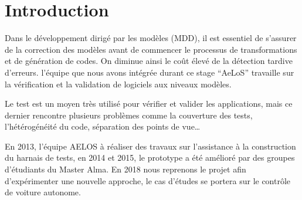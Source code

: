 \documentclass[
10pt, %
a4paper, %
oneside, %
headinclude,footinclude, %
BCOR5mm, %
]{report}
\begin{document}
								  
	\newpage			
	\dominitoc[n]		
	\tableofcontents 
								  
								  
														
								  
  \newpage
	\section{Introduction}
	Dans le développement dirigé par les modèles (MDD), il est essentiel de s’assurer de la correction des modèles avant de commencer le processus de transformations et de génération de codes. On diminue ainsi le coût élevé de la détection tardive d’erreurs. l’équipe que nous avons intégrée durant ce stage “AeLoS” travaille sur la vérification et la validation de logiciels aux niveaux modèles.
														    
	Le test est un moyen très utilisé pour vérifier et valider les applications, mais ce dernier rencontre plusieurs problèmes comme la couverture des tests, l’hétérogénéité du code, séparation des points de vue…
														    
	En 2013, l’équipe AELOS à réaliser des travaux sur l’assistance à la construction du harnais de tests, en 2014 et 2015, le prototype a été amélioré par des groupes d’étudiants du Master Alma. En 2018 nous reprenons le projet afin d'expérimenter une nouvelle approche, le cas d'études se portera sur le contrôle de voiture autonome.
								
								  
\end{document}

